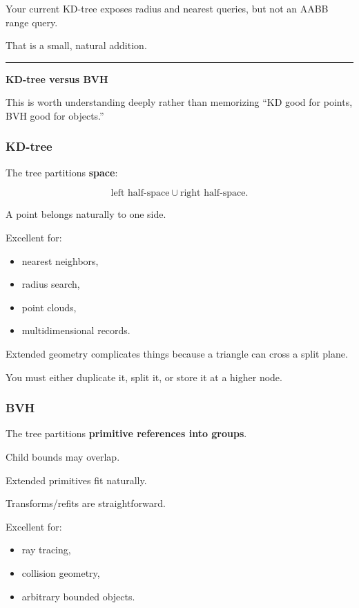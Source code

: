 Your current KD-tree exposes radius and nearest queries, but not an AABB range query.

That is a small, natural addition.

\begin{center}\rule{0.5\linewidth}{0.5pt}\end{center}

\textbf{KD-tree versus BVH}

This is worth understanding deeply rather than memorizing ``KD good for points, BVH good for objects.''

\subsubsection{KD-tree}\label{kd-tree}

The tree partitions \textbf{space}:

\[
\text{left half-space}
\cup
\text{right half-space}.
\]

A point belongs naturally to one side.

Excellent for:

\begin{itemize}
\tightlist
\item
  nearest neighbors,
\item
  radius search,
\item
  point clouds,
\item
  multidimensional records.
\end{itemize}

Extended geometry complicates things because a triangle can cross a split plane.

You must either duplicate it, split it, or store it at a higher node.

\subsubsection{BVH}\label{bvh}

The tree partitions \textbf{primitive references into groups}.

Child bounds may overlap.

Extended primitives fit naturally.

Transforms/refits are straightforward.

Excellent for:

\begin{itemize}
\tightlist
\item
  ray tracing,
\item
  collision geometry,
\item
  arbitrary bounded objects.
\end{itemize}

